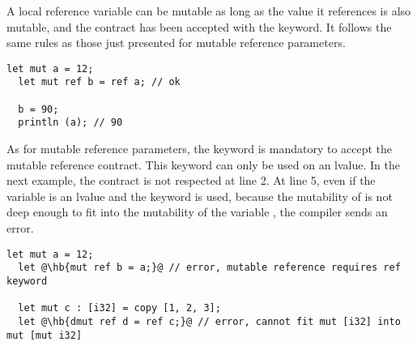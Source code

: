 A local reference variable can be mutable as long as the value it references is
also mutable, and the contract has been accepted with the  keyword.
It follows the same rules as those just presented for mutable reference
parameters.

\begin{lstlisting}[style=coloredverbatim, escapechar=@]
  let mut a = 12;
  let mut ref b = ref a; // ok

  b = 90;
  println (a); // 90
\end{lstlisting}

As for mutable reference parameters, the keyword  is mandatory to
accept the mutable reference contract. This keyword can only be used on an
lvalue. In the next example, the contract is not respected at line 2. At line 5,
even if the variable is an lvalue and the keyword  is used, because
the mutability of  is not deep enough to fit into the mutability of the
variable , the compiler sends an error.

\begin{lstlisting}[style=coloredverbatim, escapechar=@]
  let mut a = 12;
  let @\hb{mut ref b = a;}@ // error, mutable reference requires ref keyword

  let mut c : [i32] = copy [1, 2, 3];
  let @\hb{dmut ref d = ref c;}@ // error, cannot fit mut [i32] into mut [mut i32]
\end{lstlisting}

\vfill%
\pagebreak
